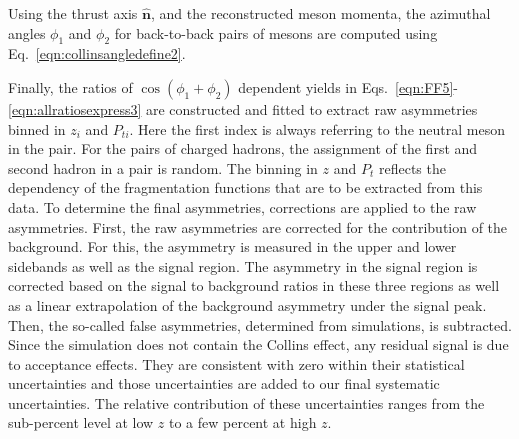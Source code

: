 \documentclass[aps,prX,preprint,groupedaddress,linenumbers]{revtex4-1}
\begin{document}
Using the thrust axis $\boldsymbol{\hat{n}}$, and the reconstructed meson momenta, the azimuthal angles $\phi_1$ and $\phi_2$ for back-to-back pairs of mesons are computed using Eq.~\ref{eqn:collinsangledefine2}.





Finally, the ratios of $\cos(\phi_1+\phi_2)$ dependent yields in Eqs.~\eqref{eqn:FF5}-\eqref{eqn:allratiosexpress3} are constructed and fitted to extract raw asymmetries binned in $z_i$ and $P_{ti}$. Here the first index is always referring to the neutral meson in the pair. For the pairs of charged hadrons, the assignment of the first and second hadron in a pair is random. The binning in $z$ and $P_t$ reflects the dependency of the fragmentation functions that are to be extracted from this data.
To determine the final asymmetries, corrections are applied to the raw asymmetries. First, the raw asymmetries are corrected for the contribution of the background. For this, the asymmetry is measured in the upper and lower sidebands as well as the signal region. The asymmetry in the signal region is corrected based on the signal to background ratios in these three regions as well as a linear extrapolation of the background asymmetry under the signal peak. 	
Then, the so-called false asymmetries, determined from simulations, is subtracted. Since the simulation does not contain the Collins effect, any residual signal is due to acceptance effects. They are consistent with zero within their statistical uncertainties and  those uncertainties are added to our final systematic uncertainties. The relative contribution of these uncertainties ranges from the sub-percent level at low $z$ to a few percent at high $z$.
\end{document}
